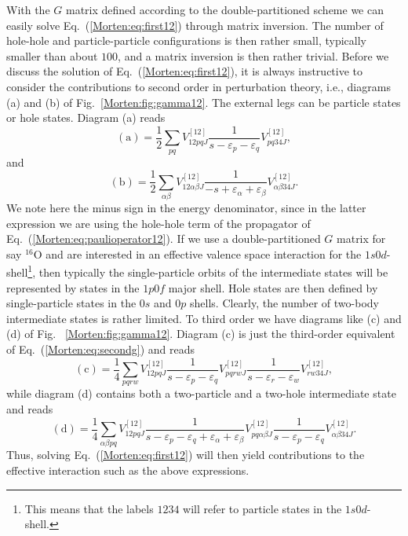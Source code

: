 With the $G$ matrix defined according 
to the double-partitioned scheme we can easily solve Eq.~(\ref{Morten:eq:first12})
through matrix inversion. The number of hole-hole and particle-particle
configurations is then rather small, typically smaller than about
$100$, and a matrix inversion
is then rather trivial. 
Before we discuss the solution of Eq.~(\ref{Morten:eq:first12}), it is always
instructive to consider the contributions to second order in 
perturbation theory, i.e., diagrams (a) and (b) of Fig.~\ref{Morten:fig:gamma12}. The external legs can be 
particle states or hole states. Diagram (a) reads
\begin{equation}
      \mathrm{(a)}=\frac{1}{2}\sum_{pq}V^{[12]}_{12pq J}
      \frac{1}{s-\varepsilon_p-
                \varepsilon_q} V^{[12]}_{pq34 J},
      \label{Morten:eq:secondg}
\end{equation}
and 
\begin{equation}
      \mathrm{(b)}=\frac{1}{2}\sum_{\alpha\beta}V^{[12]}_{12\alpha\beta J}
      \frac{1}{-s+\varepsilon_{\alpha}+
                \varepsilon_{\beta}} V^{[12]}_{\alpha\beta 34 J}.
\label{Morten:eq:diagramb}
\end{equation}
We note here the minus sign in the energy denominator,
since in the latter expression we are using
the hole-hole term of the propagator of
Eq.~(\ref{Morten:eq:paulioperator12}).
If we use a double-partitioned $G$ matrix for say $^{16}$O and
are interested in an effective valence space interaction
for the $1s0d$-shell\footnote{This means that the labels $1234$ will
refer to particle states in the $1s0d$-shell.}, then typically
the single-particle orbits of the intermediate states will be represented
by states in the $1p0f$ major shell. Hole states are then defined
by single-particle states in the $0s$ and $0p$ shells.
Clearly, the number of two-body intermediate states is rather limited. 
To third order we have diagrams like (c) and (d) of Fig.~
\ref{Morten:fig:gamma12}. Diagram (c) is just the third-order equivalent of
Eq.~(\ref{Morten:eq:secondg}) and reads
\begin{equation}
      \mathrm{(c)}=\frac{1}{4}\sum_{pqrw}V^{[12]}_{12pq J}
      \frac{1}{s-\varepsilon_p-
                \varepsilon_q} 
      V^{[12]}_{pqrw J}
      \frac{1}{s-\varepsilon_r-
                \varepsilon_w} 
       V^{[12]}_{rw34 J},
      \label{Morten:eq:thirdg}
\end{equation}
while diagram (d) contains both a two-particle and a two-hole 
intermediate state and reads
\begin{equation}
      \mathrm{(d)}=\frac{1}{4}\sum_{\alpha\beta pq}V^{[12]}_{12pq J}
      \frac{1}{s-\varepsilon_p-
                \varepsilon_q+\varepsilon_{\alpha}+
                \varepsilon_{\beta}} 
      V^{[12]}_{pq\alpha\beta J}
      \frac{1}{s-\varepsilon_p-
                \varepsilon_q} 
       V^{[12]}_{\alpha\beta 34 J}.
      \label{Morten:eq:thirdg2h}
\end{equation}
Thus, solving Eq.~(\ref{Morten:eq:first12}) will then
yield contributions to the effective interaction
such as the above expressions. 
 
